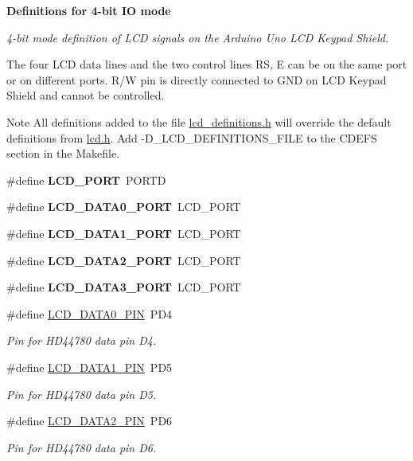 \begin{Indent}{\bf Definitions for 4-\/bit IO mode}\par
{\em 4-\/bit mode definition of L\+CD signals on the Arduino Uno L\+CD Keypad Shield.

The four L\+CD data lines and the two control lines RS, E can be on the same port or on different ports. R/W pin is directly connected to G\+ND on L\+CD Keypad Shield and cannot be controlled.

\begin{DoxyNote}{Note}
All definitions added to the file \hyperlink{a00003}{lcd\+\_\+definitions.\+h} will override the default definitions from \hyperlink{a00002}{lcd.\+h}. Add -\/\+D\+\_\+\+L\+C\+D\+\_\+\+D\+E\+F\+I\+N\+I\+T\+I\+O\+N\+S\+\_\+\+F\+I\+LE to the C\+D\+E\+FS section in the Makefile. 
\end{DoxyNote}
}\begin{DoxyCompactItemize}
\item 
\#define {\bfseries L\+C\+D\+\_\+\+P\+O\+RT}~P\+O\+R\+TD
\item 
\#define {\bfseries L\+C\+D\+\_\+\+D\+A\+T\+A0\+\_\+\+P\+O\+RT}~L\+C\+D\+\_\+\+P\+O\+RT
\item 
\#define {\bfseries L\+C\+D\+\_\+\+D\+A\+T\+A1\+\_\+\+P\+O\+RT}~L\+C\+D\+\_\+\+P\+O\+RT
\item 
\#define {\bfseries L\+C\+D\+\_\+\+D\+A\+T\+A2\+\_\+\+P\+O\+RT}~L\+C\+D\+\_\+\+P\+O\+RT
\item 
\#define {\bfseries L\+C\+D\+\_\+\+D\+A\+T\+A3\+\_\+\+P\+O\+RT}~L\+C\+D\+\_\+\+P\+O\+RT
\item 
\#define \hyperlink{a00007_gafe54d7d886b5c56bed0cf971febbb773}{L\+C\+D\+\_\+\+D\+A\+T\+A0\+\_\+\+P\+IN}~P\+D4
\begin{DoxyCompactList}\small\item\em Pin for H\+D44780 data pin D4. \end{DoxyCompactList}\item 
\#define \hyperlink{a00007_ga97fb520e7b83bb047ac5c9247de57049}{L\+C\+D\+\_\+\+D\+A\+T\+A1\+\_\+\+P\+IN}~P\+D5
\begin{DoxyCompactList}\small\item\em Pin for H\+D44780 data pin D5. \end{DoxyCompactList}\item 
\#define \hyperlink{a00007_ga7f3d53627337f6535cc8daa35876510a}{L\+C\+D\+\_\+\+D\+A\+T\+A2\+\_\+\+P\+IN}~P\+D6
\begin{DoxyCompactList}\small\item\em Pin for H\+D44780 data pin D6. \end{DoxyCompactList}\item 

\end{DoxyCompactItemize}
\end{Indent}
